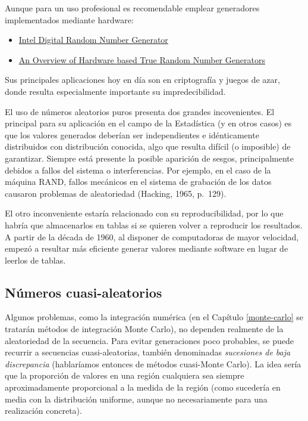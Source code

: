 \documentclass[
]{book}
\theoremstyle{break}
\theoremstyle{nonumberplain}
\begin{document}
Aunque para un uso profesional es recomendable emplear generadores implementados mediante hardware:

\begin{itemize}
\item
  \href{http://software.intel.com/en-us/articles/intel-digital-random-number-generator-drng-software-implementation-guide}{Intel Digital Random Number Generator}
\item
  \href{https://rbridge.inlab.net/manual/trngs}{An Overview of Hardware based True Random Number Generators}
\end{itemize}

Sus principales aplicaciones hoy en día son en criptografía y juegos de azar, donde resulta especialmente importante su impredecibilidad.

El uso de números aleatorios puros presenta dos grandes incovenientes.
El principal para su aplicación en el campo de la Estadística (y en otros casos) es que los valores generados deberían ser independientes e idénticamente distribuidos con distribución conocida, algo que resulta difícil (o imposible) de garantizar.
Siempre está presente la posible aparición de sesgos, principalmente debidos a fallos del sistema o interferencias.
Por ejemplo, en el caso de la máquina RAND, fallos mecánicos en el sistema de grabación de los datos causaron problemas de aleatoriedad (Hacking, 1965, p.~129).

El otro inconveniente estaría relacionado con su reproducibilidad, por lo que habría que almacenarlos en tablas si se quieren volver a reproducir los resultados.
A partir de la década de 1960, al disponer de computadoras de mayor velocidad, empezó a resultar más eficiente generar valores mediante software en lugar de leerlos de tablas.

\hypertarget{nuxfameros-cuasi-aleatorios}{%
\subsection{Números cuasi-aleatorios}\label{nuxfameros-cuasi-aleatorios}}

Algunos problemas, como la integración numérica (en el Capítulo \ref{monte-carlo} se tratarán métodos de integración Monte Carlo), no dependen realmente de la aleatoriedad de la secuencia. Para evitar generaciones poco probables, se puede recurrir a secuencias cuasi-aleatorias, también denominadas \emph{sucesiones de baja discrepancia} (hablaríamos entonces de métodos cuasi-Monte Carlo). La idea sería que la proporción de valores en una región cualquiera sea siempre aproximadamente proporcional a la medida de la región (como sucedería en media con la distribución uniforme, aunque no necesariamente para una realización concreta).
\end{document}
